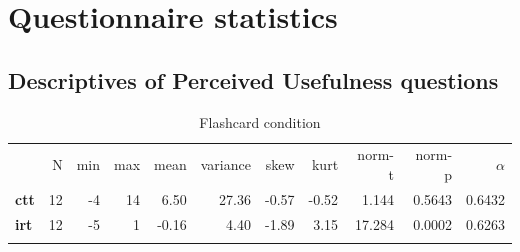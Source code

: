 \chapter{Questionnaire statistics}

\FloatBarrier
\section{Descriptives of Perceived Usefulness questions}

\begin{longtable}[c]{@{}lrrrrrrrrrr@{}}
\caption{Flashcard condition}
\endfirsthead
\endhead
\toprule\addlinespace
& N & min & max & mean & variance & skew & kurt & norm-t &
norm-p & $\alpha$
\\\addlinespace
\midrule
\textbf{ctt} & 12 & -4 & 14 & 6.50 & 27.36 & -0.57 & -0.52 & 1.144 &
0.5643 & 0.6432
\\\addlinespace
\textbf{irt} & 12 & -5 & 1 & -0.16 & 4.40 & -1.89 & 3.15 & 17.284 &
0.0002 & 0.6263
\\\addlinespace
\bottomrule
    \label{tab:usefulness_fc}
\end{longtable}

